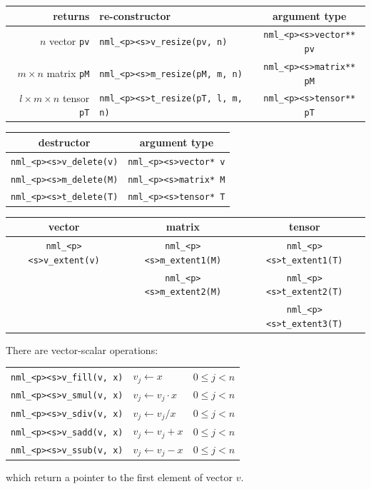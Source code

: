 \documentclass[twoside,12pt]{article}
\begin{document}
\begin{center}
\begin{tabular}{r|l|c}
				returns&re-constructor
&argument type		\\
\hline
		      $n$ vector {\tt *pv}
&{\tt nml\_<p><s>v\_resize(pv, n)}	&{\tt nml\_<p><s>vector** pv} \\
	   $m\!\times\!n$ matrix {\tt *pM}
&{\tt nml\_<p><s>m\_resize(pM, m, n)}	&{\tt nml\_<p><s>matrix** pM} \\
$l\!\times\!m\!\times\!n$ tensor {\tt *pT}
&{\tt nml\_<p><s>t\_resize(pT, l, m, n)}&{\tt nml\_<p><s>tensor** pT}
\end{tabular}
\end{center}

\begin{center}
\begin{tabular}{c|c}
destructor			&argument type			\\
\hline
{\tt nml\_<p><s>v\_delete(v)}	&{\tt nml\_<p><s>vector* v}	\\
{\tt nml\_<p><s>m\_delete(M)}	&{\tt nml\_<p><s>matrix* M}	\\
{\tt nml\_<p><s>t\_delete(T)}	&{\tt nml\_<p><s>tensor* T}
\end{tabular}
\end{center}

\begin{center}
\begin{tabular}{c|c|c}
vector
&matrix				&tensor				\\
\hline
 {\tt nml\_<p><s>v\_extent(v)}
&{\tt nml\_<p><s>m\_extent1(M)}	&{\tt nml\_<p><s>t\_extent1(T)}	\\
&{\tt nml\_<p><s>m\_extent2(M)} &{\tt nml\_<p><s>t\_extent2(T)}	\\
&				&{\tt nml\_<p><s>t\_extent3(T)}
\end{tabular}
\end{center}

There are vector-scalar operations:
\begin{center}
\begin{tabular}{c|l|l}
{\tt nml\_<p><s>v\_fill(v, x)} &$v_{j} \leftarrow x$&$0 \leq j < n$	      \\
{\tt nml\_<p><s>v\_smul(v, x)} &$v_{j} \leftarrow v_{j}\cdot x$&$0 \leq j < n$\\
{\tt nml\_<p><s>v\_sdiv(v, x)} &$v_{j} \leftarrow v_{j}/x$&$0 \leq j < n$     \\
{\tt nml\_<p><s>v\_sadd(v, x)} &$v_{j} \leftarrow v_{j} + x$&$0 \leq j < n$   \\
{\tt nml\_<p><s>v\_ssub(v, x)} &$v_{j} \leftarrow v_{j} - x$&$0 \leq j < n$
\end{tabular}
\end{center}
which return a pointer to the first element of vector $v$.
\end{document}
